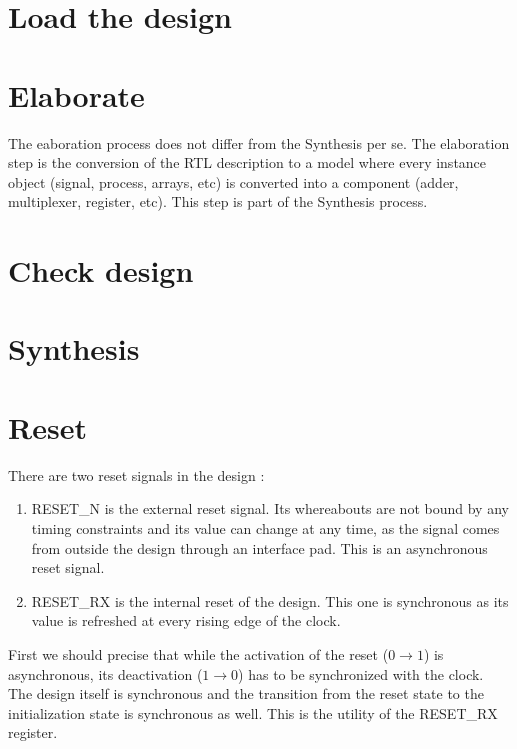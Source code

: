 \documentclass[a4paper]{article}
\begin{document}
\section{Load the design}

\section{Elaborate}

The eaboration process does not differ from the Synthesis per se. The elaboration step
is the conversion of the RTL description to a model where every instance object (signal,
process, arrays, etc) is converted into a component (adder, multiplexer, register, etc).
This step is part of the Synthesis process.

\section{Check design}

\section{Synthesis}

\section{Reset}
There are two reset signals in the design :
\begin{enumerate}
  \item RESET\_N is the external reset signal. Its whereabouts are not bound by any timing
  constraints and its value can change at any time, as the signal comes from outside the
  design through an interface pad. This is an asynchronous reset signal.
  \item RESET\_RX is the internal reset of the design. This one is synchronous as its
  value is refreshed at every rising edge of the clock.
\end{enumerate}

First we should precise that while the activation of the reset ($0 \rightarrow 1$) is asynchronous,
its deactivation ($1 \rightarrow 0$) has to be synchronized with the clock. The design itself is
synchronous and the transition from the reset state to the initialization state is synchronous as
well. This is the utility of the RESET\_RX register.
\end{document}
